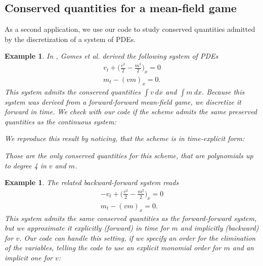 \documentclass[sigconf,twocolumn]{acmart}
\newcommand{\1}{{\chi}}
\numberwithin{equation}{section}
\theoremstyle{thmlemcorr}
\numberwithin{theorem}{section}
\theoremstyle{thmlemcorr*}
\theoremstyle{defi}
\theoremstyle{remexample}
\newtheorem{example}[theorem]{Example}
\theoremstyle{ass}
\begin{document}
\subsection*{Conserved quantities for a mean-field game}
As a second application, we use our code to study conserved quantities admitted by the discretization of a system of PDEs.
\begin{example}
	In \cite{gomes18}, Gomes et al. derived the following system of PDEs
	\begin{gather*}
		v_t+\Big(\frac{v^2}{2}-\frac{m^2}{2}\Big)_x=0\\
		m_t-(vm)_x=0.
	\end{gather*}
	This system admits the conserved quantities \(\int v\ dx\) and \(\int m\ dx\).
	Because this system was derived from a forward-forward mean-field game, we discretize it forward in time. We check with our code if the scheme admits the same preserved quantities as the continuous system:
	
	\begin{small}
		
		
	\end{small}
	We reproduce this result by noticing, that the scheme is in time-explicit form:
	
	\begin{small}
		
		
	\end{small}
	Those are the only conserved quantities for this scheme, that are polynomials up to degree 4 in \(v\) and \(m\).
	
	\begin{small}
		
		
	\end{small}
\end{example}
\begin{example}
	The related backward-forward system reads
	\begin{gather*}
		-v_t+\Big(\frac{v^2}{2}-\frac{m^2}{2}\Big)_x=0\\
		m_t-(vm)_x=0.
	\end{gather*}
	This system admits the same conserved quantities as the forward-forward system, but we approximate it explicitly (forward) in time for \(m\) and implicitly (backward) for \(v\). Our code can handle this setting, if we specify an order for the elimination of the variables, telling the code to use an explicit monomial order for \(m\) and an implicit one for \(v\):
	
	\begin{small}
		
		
	\end{small}
\end{example}
\end{document}
